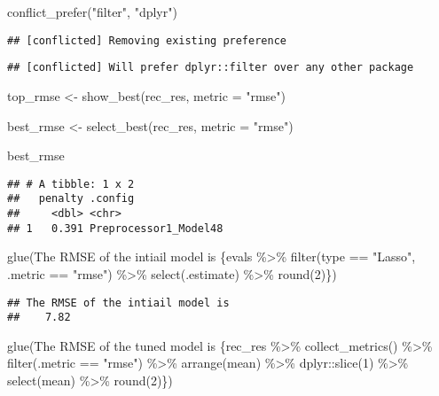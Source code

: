 \documentclass[
]{book}
\newenvironment{Shaded}{\begin{snugshade}}{\end{snugshade}}
\newcommand{\AttributeTok}[1]{\textcolor[rgb]{0.77,0.63,0.00}{#1}}
\newcommand{\FunctionTok}[1]{\textcolor[rgb]{0.00,0.00,0.00}{#1}}
\newcommand{\NormalTok}[1]{#1}
\newcommand{\OtherTok}[1]{\textcolor[rgb]{0.56,0.35,0.01}{#1}}
\newcommand{\StringTok}[1]{\textcolor[rgb]{0.31,0.60,0.02}{#1}}
\begin{document}
\begin{Shaded}
\begin{Highlighting}[]
\FunctionTok{conflict\_prefer}\NormalTok{(}\StringTok{"filter"}\NormalTok{, }\StringTok{"dplyr"}\NormalTok{)}
\end{Highlighting}
\end{Shaded}

\begin{verbatim}
## [conflicted] Removing existing preference
\end{verbatim}

\begin{verbatim}
## [conflicted] Will prefer dplyr::filter over any other package
\end{verbatim}

\begin{Shaded}
\begin{Highlighting}[]
\NormalTok{top\_rmse }\OtherTok{\textless{}{-}} \FunctionTok{show\_best}\NormalTok{(rec\_res, }\AttributeTok{metric =} \StringTok{"rmse"}\NormalTok{)}

\NormalTok{best\_rmse }\OtherTok{\textless{}{-}} \FunctionTok{select\_best}\NormalTok{(rec\_res, }\AttributeTok{metric =} \StringTok{"rmse"}\NormalTok{)}

\NormalTok{best\_rmse}
\end{Highlighting}
\end{Shaded}

\begin{verbatim}
## # A tibble: 1 x 2
##   penalty .config              
##     <dbl> <chr>                
## 1   0.391 Preprocessor1_Model48
\end{verbatim}

\begin{Shaded}
\begin{Highlighting}[]
\FunctionTok{glue}\NormalTok{(}\StringTok{\textquotesingle{}The RMSE of the intiail model is}
\StringTok{     \{evals \%\textgreater{}\%}
\StringTok{  filter(type == "Lasso", .metric == "rmse") \%\textgreater{}\%}
\StringTok{  select(.estimate) \%\textgreater{}\%}
\StringTok{  round(2)\}\textquotesingle{}}\NormalTok{)}
\end{Highlighting}
\end{Shaded}

\begin{verbatim}
## The RMSE of the intiail model is
##    7.82
\end{verbatim}

\begin{Shaded}
\begin{Highlighting}[]
\FunctionTok{glue}\NormalTok{(}\StringTok{\textquotesingle{}The RMSE of the tuned model is \{rec\_res \%\textgreater{}\%}
\StringTok{  collect\_metrics() \%\textgreater{}\%}
\StringTok{  filter(.metric == "rmse") \%\textgreater{}\%}
\StringTok{  arrange(mean) \%\textgreater{}\%}
\StringTok{  dplyr::slice(1) \%\textgreater{}\%}
\StringTok{  select(mean) \%\textgreater{}\%}
\StringTok{  round(2)\}\textquotesingle{}}\NormalTok{)}
\end{Highlighting}
\end{Shaded}
\end{document}
